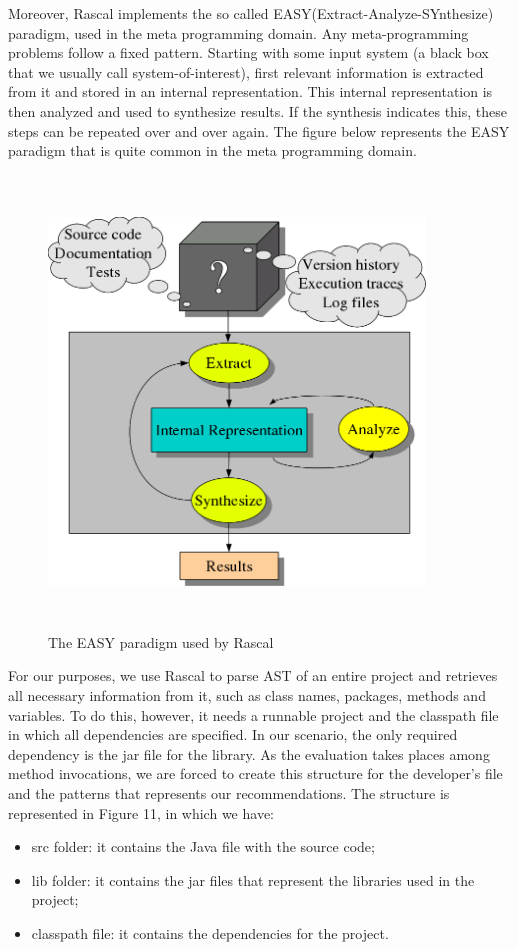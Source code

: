 Moreover, Rascal implements the so called EASY(Extract-Analyze-SYnthesize) paradigm, used in the meta programming domain. Any meta-programming problems follow a fixed pattern. Starting with some input system (a black box that we usually call system-of-interest), first relevant information is extracted from it and stored in an internal representation. This internal representation is then analyzed and used to synthesize results. If the synthesis indicates this, these steps can be repeated over and over again. The figure below represents the EASY paradigm that is quite common in the meta programming domain.

\begin{figure}[H]
\includegraphics[width=10cm,height=12cm,keepaspectratio]{images/EASY.png}
\centering
  \caption{The EASY paradigm used by Rascal}
  \label{fig:cmd}
\end{figure}

For our purposes, we use Rascal to parse AST of an entire project and retrieves all necessary information from it, such as class names, packages, methods and variables.
To do this, however, it needs a runnable project and the classpath file in which all dependencies are specified. In our scenario, the only required dependency is the jar file for the library. As the evaluation takes places among method invocations, we are forced to create this structure for the developer's file and the patterns that represents our recommendations. The structure is represented in Figure 11, in which we have:
\begin{itemize}
\item src folder: it contains the Java file with the source code;
\item lib folder: it contains the jar files that represent the libraries used in the project;
\item classpath file: it contains the dependencies for the project.
\end{itemize}


